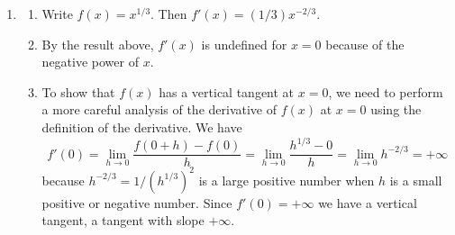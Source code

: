 \documentclass{article}
\begin{document}
\begin{enumerate}
\item \label{prob:1323} 
  \begin{enumerate}
  \item Write $f(x)=x^{1/3}$.  Then $f'(x)=(1/3)x^{-2/3}$.
  \item By the result above, $f'(x)$ is undefined for $x=0$ because of the
    negative power of $x$.
  \item To show that $f(x)$ has a vertical tangent at $x=0$, we need to
    perform a more careful analysis of the derivative of $f(x)$ at $x=0$
    using the definition of the derivative.  We have
    \begin{equation*}
      f'(0) = \lim_{h\to 0} \frac{f(0+h)-f(0)}{h}
      = \lim_{h\to 0} \frac{h^{1/3}-0}{h}
      = \lim_{h\to 0} h^{-2/3} = +\infty
    \end{equation*}
    because $h^{-2/3}=1/(h^{1/3})^2$ is a large positive number when
    $h$ is a small positive or negative number.  Since $f'(0)=+\infty$ we
    have a vertical tangent, a tangent with slope $+\infty$.


\end{enumerate}
\end{enumerate}
\end{document}
